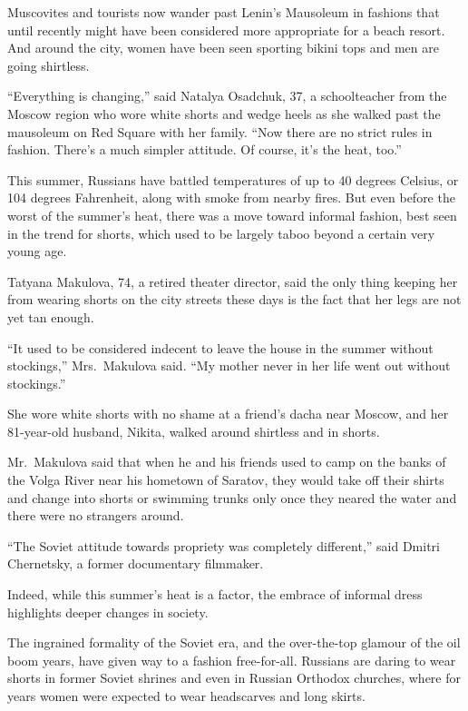 ﻿\documentclass[12pt]{article}
\begin{document}
Muscovites and tourists now wander past Lenin's Mausoleum in fashions that until recently might have
been considered more appropriate for a beach resort. And around the city, women have been seen
sporting bikini tops and men are going shirtless.

``Everything is changing,'' said Natalya Osadchuk, 37, a schoolteacher from the Moscow region who
wore white shorts and wedge heels as she walked past the mausoleum on Red Square with her family.
``Now there are no strict rules in fashion. There's a much simpler attitude. Of course, it's the
heat, too.''

This summer, Russians have battled temperatures of up to 40 degrees Celsius, or 104 degrees
Fahrenheit, along with smoke from nearby fires. But even before the worst of the summer's heat,
there was a move toward informal fashion, best seen in the trend for shorts, which used to be
largely taboo beyond a certain very young age.

Tatyana Makulova, 74, a retired theater director, said the only thing keeping her from wearing
shorts on the city streets these days is the fact that her legs are not yet tan enough.

``It used to be considered indecent to leave the house in the summer without stockings,''
Mrs.~Makulova said. ``My mother never in her life went out without stockings.''

She wore white shorts with no shame at a friend's dacha near Moscow, and her 81-year-old husband,
Nikita, walked around shirtless and in shorts.

Mr.~Makulova said that when he and his friends used to camp on the banks of the Volga River near his
hometown of Saratov, they would take off their shirts and change into shorts or swimming trunks only
once they neared the water and there were no strangers around.

``The Soviet attitude towards propriety was completely different,'' said Dmitri Chernetsky, a former
documentary filmmaker.

Indeed, while this summer's heat is a factor, the embrace of informal dress highlights deeper
changes in society.

The ingrained formality of the Soviet era, and the over-the-top glamour of the oil boom years, have
given way to a fashion free-for-all. Russians are daring to wear shorts in former Soviet shrines and
even in Russian Orthodox churches, where for years women were expected to wear headscarves and long
skirts.
\end{document}
